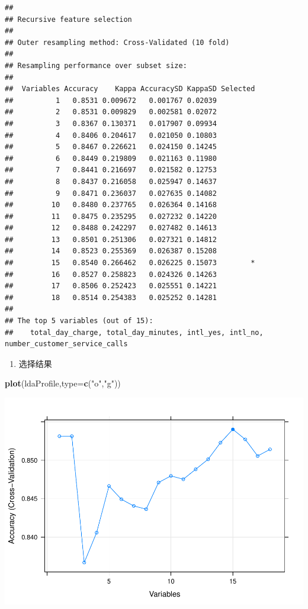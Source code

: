 \documentclass[
]{article}
\newenvironment{Shaded}{\begin{snugshade}}{\end{snugshade}}
\newcommand{\DataTypeTok}[1]{\textcolor[rgb]{0.13,0.29,0.53}{#1}}
\newcommand{\KeywordTok}[1]{\textcolor[rgb]{0.13,0.29,0.53}{\textbf{#1}}}
\newcommand{\NormalTok}[1]{#1}
\newcommand{\StringTok}[1]{\textcolor[rgb]{0.31,0.60,0.02}{#1}}
\providecommand{\tightlist}{%
  \setlength{\itemsep}{0pt}\setlength{\parskip}{0pt}}
\begin{document}
\begin{verbatim}
## 
## Recursive feature selection
## 
## Outer resampling method: Cross-Validated (10 fold) 
## 
## Resampling performance over subset size:
## 
##  Variables Accuracy    Kappa AccuracySD KappaSD Selected
##          1   0.8531 0.009672   0.001767 0.02039         
##          2   0.8531 0.009829   0.002581 0.02072         
##          3   0.8367 0.130371   0.017907 0.09934         
##          4   0.8406 0.204617   0.021050 0.10803         
##          5   0.8467 0.226621   0.024150 0.14245         
##          6   0.8449 0.219809   0.021163 0.11980         
##          7   0.8441 0.216697   0.021582 0.12753         
##          8   0.8437 0.216058   0.025947 0.14637         
##          9   0.8471 0.236037   0.027635 0.14082         
##         10   0.8480 0.237765   0.026364 0.14168         
##         11   0.8475 0.235295   0.027232 0.14220         
##         12   0.8488 0.242297   0.027482 0.14613         
##         13   0.8501 0.251306   0.027321 0.14812         
##         14   0.8523 0.255369   0.026387 0.15208         
##         15   0.8540 0.266462   0.026225 0.15073        *
##         16   0.8527 0.258823   0.024326 0.14263         
##         17   0.8506 0.252423   0.025551 0.14221         
##         18   0.8514 0.254383   0.025252 0.14281         
## 
## The top 5 variables (out of 15):
##    total_day_charge, total_day_minutes, intl_yes, intl_no, number_customer_service_calls
\end{verbatim}

\begin{enumerate}
\def\labelenumi{\arabic{enumi}.}
\setcounter{enumi}{8}
\tightlist
\item
  选择结果
\end{enumerate}

\begin{Shaded}
\begin{Highlighting}[]
\KeywordTok{plot}\NormalTok{(ldaProfile,}\DataTypeTok{type=}\KeywordTok{c}\NormalTok{(}\StringTok{"o"}\NormalTok{,}\StringTok{"g"}\NormalTok{))}
\end{Highlighting}
\end{Shaded}

\includegraphics{R_FinalReport_files/figure-latex/unnamed-chunk-27-1.pdf}
\end{document}
